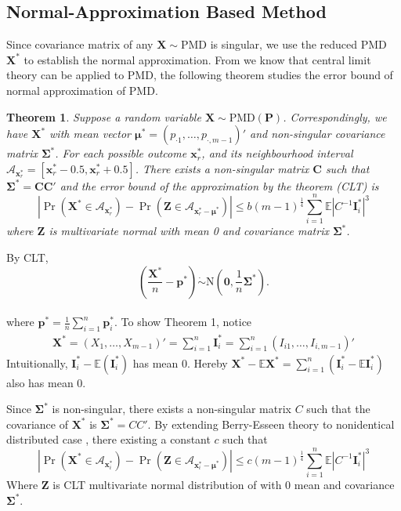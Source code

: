 \documentclass[12pt]{article}
\newcommand{\zerovec}{{\boldsymbol{0}}}
\newcommand{\Ivec}{{\boldsymbol{I}}}
\newcommand{\EE}{\mathbb{E}}
\newcommand{\Cmat}{\mathbf{C}}
\newcommand{\Zmat}{\mathbf{Z}}
\newcommand{\Pmat}{\mathbf{P}}
\newcommand{\pvec}{\boldsymbol{p}}
\newcommand{\N}{\textrm{N}}
\newcommand{\PMD}{\textrm{PMD}}
\newcommand{\Xvec}{\boldsymbol{X}}
\newcommand{\xvec}{\boldsymbol{x}}
\newcommand{\muvec}{\boldsymbol{\mu}}
\newcommand{\Sig}{\boldsymbol{\Sigma}}
\newcommand{\mvec}{\boldsymbol{\mu}}
\newtheorem{thm}{Theorem}
\begin{document}
\subsection{Normal-Approximation Based Method}
Since covariance matrix of any $\Xvec \sim \PMD$ is singular, we use the reduced $\PMD$ $\Xvec^{\ast}$ to establish the normal approximation. From   we know that central limit theory can be applied to $\PMD$, the following theorem studies the error bound of normal approximation of $\PMD$.
\begin{thm}
Suppose a random variable $\Xvec \sim \PMD(\Pmat)$. Correspondingly, we have $\Xvec^{\ast}$ with mean vector $\mvec^{\ast} = \left( p_{\cdot1} ,\dots,p_{\cdot,m-1}\right)'$ and non-singular covariance matrix $\Sig^{\ast}$. For each possible outcome $\xvec_r^{\ast}$, and its neighbourhood interval $\mathcal{A}_{\xvec_r^{\ast}} = [\xvec_r^{\ast}-0.5, \xvec_r^{\ast}+0.5]$. There exists a non-singular matrix $\Cmat$ such that $\Sig^{\ast} = \Cmat\Cmat'$ and the error bound of the approximation by the theorem (CLT) is
\begin{equation*}
    |\Pr(\Xvec^{\ast} \in \mathcal{A}_{\xvec_r^{\ast}}) - \Pr(\Zmat \in \mathcal{A}_{\xvec_r^{\ast}-\mvec^{\ast}})| \leq b (m-1)^{\frac{1}{4}} \sum_{i=1}^{n}\EE|C^{-1}\Ivec_{i}^{\ast}|^3
\end{equation*}
where $\Zmat$ is multivariate normal with mean 0 and covariance matrix $\Sig^{\ast}$.
\end{thm}
By CLT,
$$\left(\frac{\Xvec^{\ast}}{n}-\pvec^{\ast}\right)\dot\sim \N\left(\zerovec, \frac{1}{n}\Sig^{\ast}\right).$$\\
where $\pvec^{\ast} = \frac{1}{n}\sum_{i=1}^{n}\pvec_i^{\ast}$.
To show Theorem 1, notice
\begin{align*}
    \Xvec^{\ast} = (X_1,\dots,X_{m-1})' = \sum_{i=1}^{n} \Ivec_{i}^{\ast}= \sum_{i=1}^{n} (I_{i1},\dots,I_{i,m-1})'
\end{align*}
Intuitionally, $\Ivec_i^{\ast} - \EE(\Ivec_i^{\ast})$ has mean 0. Hereby $\Xvec^{\ast} - \EE \Xvec^{\ast} = \sum_{i=1}^{n} (\Ivec_i^{\ast} - \EE \Ivec_{i}^{\ast})$ also has mean 0. 

Since $\Sig^{\ast}$ is non-singular, there exists a non-singular matrix $C$ such that the covariance of $\Xvec^{\ast}$ is $\Sig^{\ast} = CC'$. By extending Berry-Esseen theory to nonidentical distributed case \cite{article}, there existing  a constant $c$ such that
\begin{equation*}
    |\Pr\left(\Xvec^{\ast} \in \mathcal{A}_{\xvec_i^{\ast}}\right) - \Pr\left(\Zmat \in \mathcal{A}_{\xvec_i^{\ast}-\muvec^{\ast}} \right)| \leq c(m-1)^{\frac{1}{4}}\sum_{i=1}^{n} \EE \left|C^{-1}\Ivec_i^{\ast}\right|^3
\end{equation*}
Where $\Zmat$ is CLT multivariate normal distribution of with 0 mean and covariance $\Sig^{\ast}$.
\end{document}
